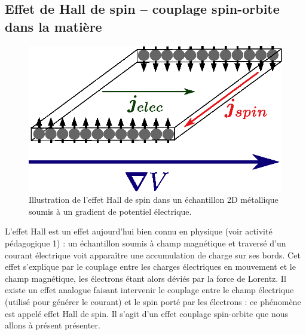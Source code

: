 \documentclass[a4paper,11pt]{article} %
\begin{document}
	
	\subsection{Effet de Hall de spin -- couplage spin-orbite dans la matière}
	
	\begin{figure}[h]
		\centering
		\begin{minipage}[c]{0.85\linewidth}
			\centering
			\includegraphics[width=0.5\linewidth]{./Illustrations/SHE_electrons.eps}
			\caption{Illustration de l'effet Hall de spin dans un échantillon 2D métallique soumis à un gradient de potentiel électrique.}
			\label{fig:spin-Hall-effect}
		\end{minipage}
	\end{figure}
	
	L'effet Hall est un effet aujourd'hui bien connu en physique (voir activité pédagogique 1) : un échantillon soumis à champ magnétique et traversé d'un courant électrique voit apparaître une accumulation de charge sur ses bords. Cet effet s'explique par le couplage entre les charges électriques en mouvement et le champ magnétique, les électrons étant alors déviés par la force de Lorentz. Il existe un effet analogue faisant intervenir le couplage entre le champ électrique (utilisé pour générer le courant) et le spin porté par les électrons : ce phénomène est appelé effet Hall de spin. Il s'agit d'un effet couplage spin-orbite que nous allons à présent présenter.\\ 
	
\end{document}
